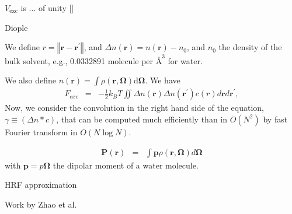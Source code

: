 $V_{\mathrm{exc}}$ is ... of unity {[}{]}

Diople

We define $r=\left\Vert \bm{r}-\bm{r}^{\prime}\right\Vert $, and
$\Delta n\left(\bm{r}\right)=n\left(\bm{r}\right)-n_{0}$, and $n_{0}$
the density of the bulk solvent, e.g., 0.0332891 molecule per $\textrm{\AA}^{3}$
for water.

We also define $n\left(\bm{r}\right)=\int\rho(\bm{r},\boldsymbol{\Omega})\mbox{d}\boldsymbol{\Omega}$.
We have 
\begin{eqnarray}
F_{exc} & = & -\frac{1}{2}k_{B}T\iint\Delta n\left(\boldsymbol{r}\right)\Delta n\left(\boldsymbol{r}^{\prime}\right)c\left(r\right)d\bm{r}d\bm{r}^{\prime},
\end{eqnarray}
Now, we consider the convolution in the right hand side of the equation,
$\gamma\equiv\left(\Delta n*c\right)$, that can be computed much
efficiently than in $O\left(N^{2}\right)$ by fast Fourier transform
in $O\left(N\log N\right)$.

\begin{eqnarray}
\bm{P}\left(\bm{r}\right) & = & \int\bm{p}\rho\left(\bm{r},\bm{\Omega}\right)d\bm{\Omega}
\end{eqnarray}
with $\bm{p}=p\bm{\Omega}$ the dipolar moment of a water molecule.

HRF approximation \citep{Zhao_2011}

Work by Zhao et al.
